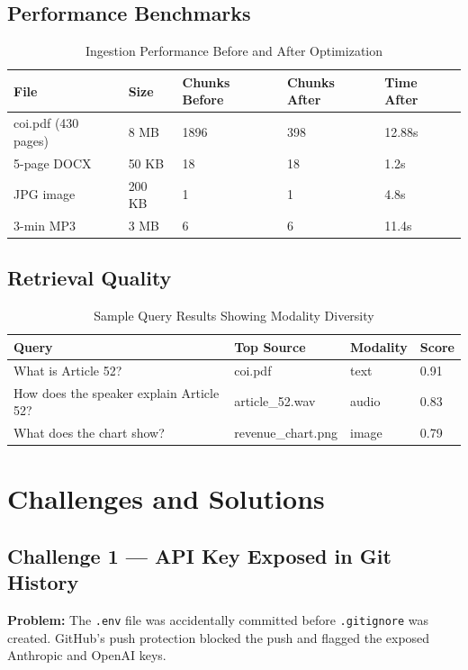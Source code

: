 \documentclass[12pt,a4paper]{report}
\begin{document}
\section{Performance Benchmarks}

\begin{table}[H]
\centering
\caption{Ingestion Performance Before and After Optimization}
\begin{tabular}{p{3.5cm}p{2cm}p{2.5cm}p{2.5cm}p{2.5cm}}
\toprule
\textbf{File} & \textbf{Size} & \textbf{Chunks Before} & \textbf{Chunks After} & \textbf{Time After} \\
\midrule
coi.pdf (430 pages) & 8 MB & 1896 & 398 & 12.88s \\
5-page DOCX & 50 KB & 18 & 18 & 1.2s \\
JPG image & 200 KB & 1 & 1 & 4.8s \\
3-min MP3 & 3 MB & 6 & 6 & 11.4s \\
\bottomrule
\end{tabular}
\end{table}

\section{Retrieval Quality}

\begin{table}[H]
\centering
\caption{Sample Query Results Showing Modality Diversity}
\begin{tabular}{p{5cm}p{3.5cm}p{2cm}p{2cm}}
\toprule
\textbf{Query} & \textbf{Top Source} & \textbf{Modality} & \textbf{Score} \\
\midrule
What is Article 52? & coi.pdf & text & 0.91 \\
How does the speaker explain Article 52? & article\_52.wav & audio & 0.83 \\
What does the chart show? & revenue\_chart.png & image & 0.79 \\
\bottomrule
\end{tabular}
\end{table}

\chapter{Challenges and Solutions}

\section{Challenge 1 --- API Key Exposed in Git History}
\textbf{Problem:} The \texttt{.env} file was accidentally committed before \texttt{.gitignore} was created. GitHub's push protection blocked the push and flagged the exposed Anthropic and OpenAI keys.
\end{document}
